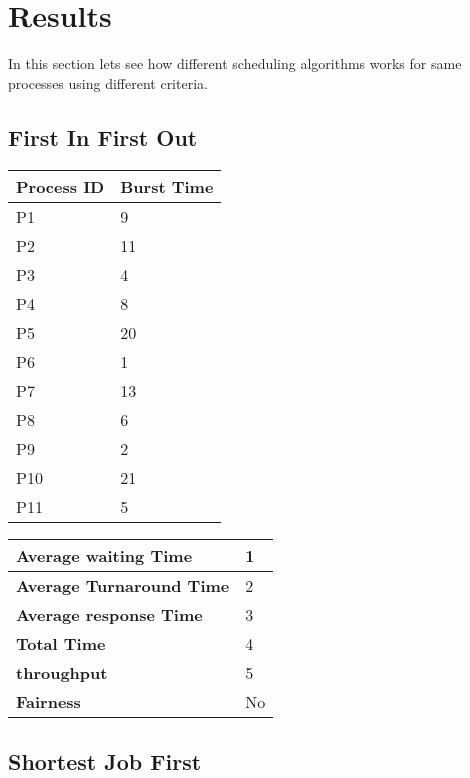 \documentclass{article}
\begin{document}
\section{Results}
In this section lets see how different scheduling algorithms works for same processes using different criteria.
\vspace{\baselineskip}
\subsection{First In First Out}

\vspace{\baselineskip}
\hspace{1cm}
\begin{minipage}[t]{0.3\textwidth}
    \begin{tabularx}{\textwidth}{|l|X|}
    \hline
    \textbf{Process ID} & \textbf{Burst Time}\\
    \hline
    P1 & 9 \\
    P2 & 11 \\
    P3 & 4 \\
    P4 & 8 \\
    P5 & 20 \\
    P6 & 1 \\
    P7 & 13 \\
    P8 & 6 \\
    P9 & 2 \\
    P10 & 21 \\
    P11 & 5 \\
    \hline
    \end{tabularx}
\end{minipage}
\hspace{2cm}
\begin{minipage}[t!]{0.35\textwidth}
    \begin{tabularx}{\textwidth}{|l|X|}
    \hline
    \textbf{Average waiting Time} & 1 \\
    \hline
    \textbf{Average Turnaround Time} & 2 \\
    \hline
    \textbf{Average response Time} & 3 \\
    \hline
    \textbf{Total Time} & 4 \\
    \hline
    \textbf{throughput} & 5 \\
    \hline
    \textbf{Fairness} & No \\
    \hline
    \end{tabularx}
\end{minipage}

\subsection{Shortest Job First}
\end{document}
